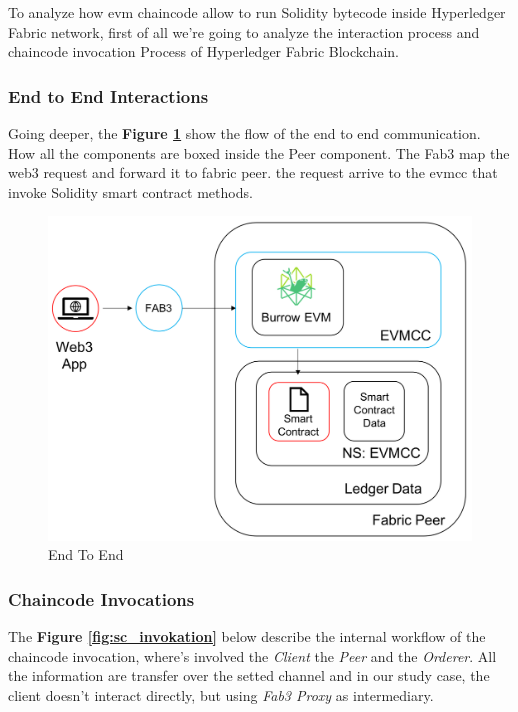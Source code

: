 To analyze how evm chaincode allow to run Solidity bytecode inside Hyperledger Fabric network, first
of all we're going to analyze the interaction process and chaincode invocation Process of Hyperledger 
Fabric Blockchain. 

\subsubsection{End to End Interactions} 
Going deeper, the \textbf{Figure \ref{fig:end_to_end}} show the flow of the end to end communication. How all the components are boxed 
inside the Peer component. The Fab3 map the web3 request and forward it to fabric peer. the request 
arrive to the evmcc that invoke Solidity smart contract methods.

\begin{figure}[h!]
    \centering
    \includegraphics[totalheight=7.5cm]{img/EndToEnd.png}
    \caption{End To End}
    \label{fig:end_to_end}
\end{figure}

\subsubsection{Chaincode Invocations}
The \textbf{Figure \ref{fig:sc_invokation}} below describe the internal workflow of the chaincode invocation, where's involved the 
\textit{Client} the \textit{Peer} and the \textit{Orderer}. All the information are transfer over the 
setted channel and in our study case, the client doesn't interact directly, but using \textit{Fab3 Proxy}
as intermediary.

